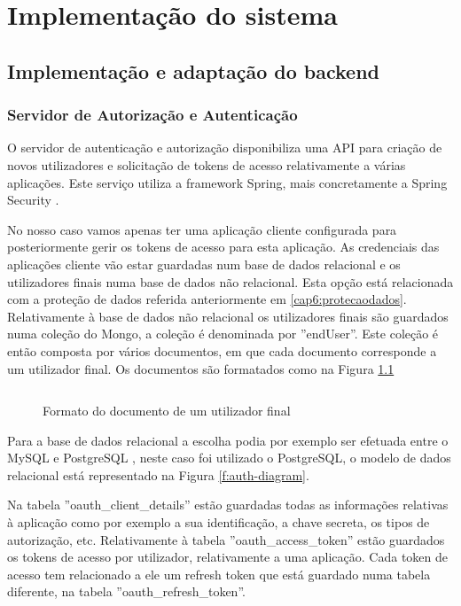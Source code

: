 \chapter{Implementação do sistema}

\section{Implementação e adaptação do backend}
\subsection{Servidor de Autorização e Autenticação}
O servidor de autenticação e autorização disponibiliza uma \gls{API} para criação de novos utilizadores e solicitação de tokens de acesso relativamente a várias aplicações. Este serviço utiliza a framework Spring, mais concretamente a Spring Security \cite{spring-framework}. \par 
No nosso caso vamos apenas ter uma aplicação cliente configurada para posteriormente gerir os tokens de acesso para esta aplicação. As credenciais das aplicações cliente vão estar guardadas num base de dados relacional e os utilizadores finais numa base de dados não relacional. Esta opção está relacionada com a proteção de dados referida anteriormente em \ref{cap6:protecaodados}. 
Relativamente à base de dados não relacional os utilizadores finais são guardados numa coleção do Mongo, a coleção é denominada por ''endUser''. Este coleção é então composta por vários documentos, em que cada documento corresponde a um utilizador final. Os documentos são formatados como na Figura \ref{f:endUserCode}

\begin{figure}[H]
\inputminted[fontsize=\scriptsize]{json}{code/endUser.json}
\caption[Formato do documento de um utilizador final]{Formato do documento de um utilizador final}
\label{f:endUserCode}
\end{figure}

Para a base de dados relacional a escolha podia por exemplo ser efetuada entre o MySQL \cite{mysql} e PostgreSQL \cite{postgresql}, neste caso foi utilizado o PostgreSQL, o modelo de dados relacional está representado na Figura \ref{f:auth-diagram}. \par 
Na tabela ''oauth\_client\_details'' estão guardadas todas as informações relativas à aplicação como por exemplo a sua identificação, a chave secreta, os tipos de autorização, etc. Relativamente à tabela ''oauth\_access\_token'' estão guardados os tokens de acesso por utilizador, relativamente a uma aplicação. Cada token de acesso tem relacionado a ele  um refresh token que está guardado numa tabela diferente, na tabela ''oauth\_refresh\_token''.

